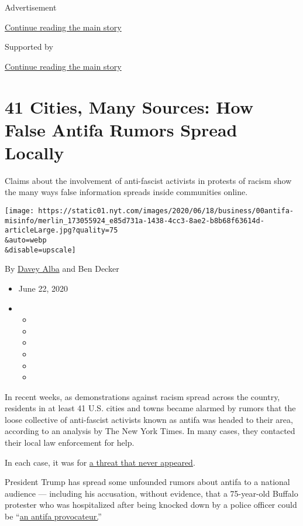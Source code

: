 Advertisement

\protect\hyperlink{after-top}{Continue reading the main story}

Supported by

\protect\hyperlink{after-sponsor}{Continue reading the main story}

\hypertarget{41-cities-many-sources-how-false-antifa-rumors-spread-locally}{%
\section{41 Cities, Many Sources: How False Antifa Rumors Spread
Locally}\label{41-cities-many-sources-how-false-antifa-rumors-spread-locally}}

Claims about the involvement of anti-fascist activists in protests of
racism show the many ways false information spreads inside communities
online.

\texttt{[image: https://static01.nyt.com/images/2020/06/18/business/00antifa-misinfo/merlin\_173055924\_e85d731a-1438-4cc3-8ae2-b8b68f63614d-articleLarge.jpg?quality=75\\\&auto=webp\\\&disable=upscale]}

By \href{https://www.nytimes.com/by/davey-alba}{Davey Alba} and Ben
Decker

\begin{itemize}
\item
  June 22, 2020
\item
  \begin{itemize}
  \item
  \item
  \item
  \item
  \item
  \item
  \end{itemize}
\end{itemize}

In recent weeks, as demonstrations against racism spread across the
country, residents in at least 41 U.S. cities and towns became alarmed
by rumors that the loose collective of anti-fascist activists known as
antifa was headed to their area, according to an analysis by The New
York Times. In many cases, they contacted their local law enforcement
for help.

In each case, it was for
\href{https://www.nytimes.com/2020/06/11/us/antifa-protests-george-floyd.html}{a
threat that never appeared}.

President Trump has spread some unfounded rumors about antifa to a
national audience --- including his accusation, without evidence, that a
75-year-old Buffalo protester who was hospitalized after being knocked
down by a police officer could be
``\href{https://www.nytimes.com/2020/06/09/nyregion/who-is-martin-gugino-buffalo-police.html}{an
antifa provocateur.}''


